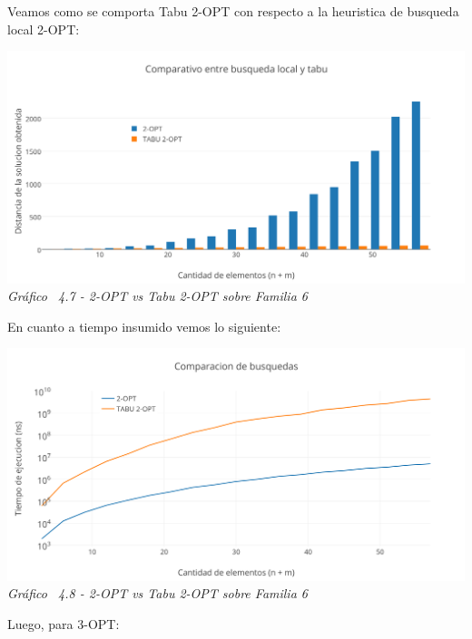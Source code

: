 Veamos como se comporta Tabu 2-OPT con respecto a la heuristica de busqueda local 2-OPT:

\vspace*{0.3cm} \vspace*{0.3cm}
  \begin{center}
 \includegraphics[scale=0.5]{./EJ4/comparativosinorden2opt.png}\\
 {            \textit{Gráfico \ 4.7 - 2-OPT vs Tabu 2-OPT sobre Familia 6}}
  \end{center}
  \vspace*{0.3cm}

En cuanto a tiempo insumido vemos lo siguiente:

\vspace*{0.3cm} \vspace*{0.3cm}
  \begin{center}
 \includegraphics[scale=0.5]{./EJ4/medicion2optsinorden.png}\\
 {            \textit{Gráfico \ 4.8 - 2-OPT vs Tabu 2-OPT sobre Familia 6}}
  \end{center}
  \vspace*{0.3cm}


Luego, para 3-OPT:

